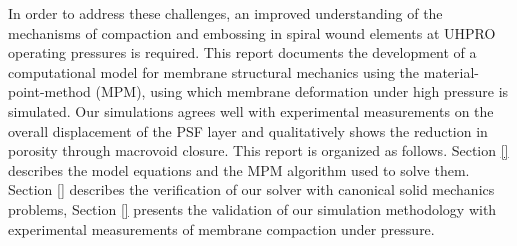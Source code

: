 In order to address these challenges, an improved understanding of the mechanisms of compaction and embossing in spiral wound elements at UHPRO operating pressures is required. This report documents the development of a computational model for membrane structural mechanics using the material-point-method (MPM), using which membrane deformation under high pressure is simulated. Our simulations agrees well with experimental measurements on the overall displacement of the PSF layer and qualitatively shows the reduction in porosity through macrovoid closure. This report is organized as follows. Section \ref{} describes the model equations and the MPM algorithm used to solve them. Section \ref{} describes the verification of our solver with canonical solid mechanics problems, Section \ref{} presents the validation of our simulation methodology with experimental measurements of membrane compaction under pressure. 



